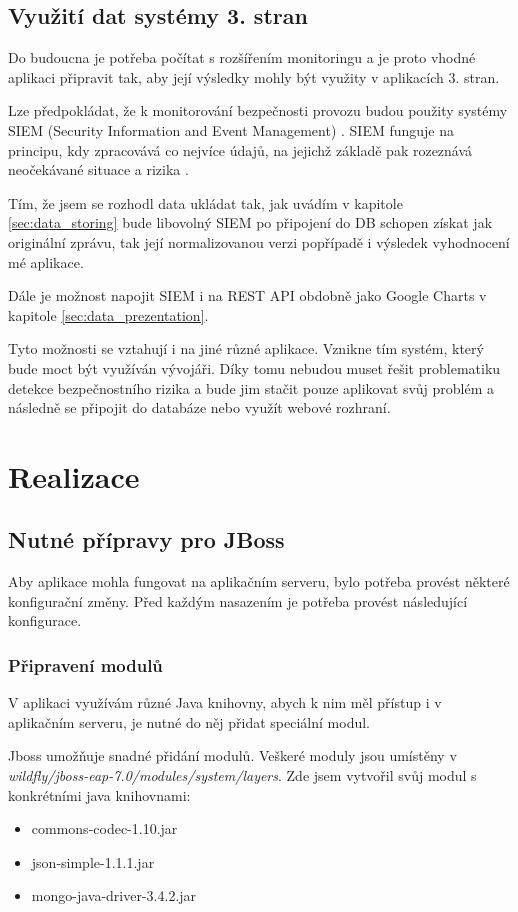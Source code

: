 \documentclass[thesis=M,czech]{FITthesis}[2012/10/20]
\begin{document}
	\section{Využití dat systémy 3. stran}
		Do budoucna je potřeba počítat s rozšířením monitoringu a je proto vhodné aplikaci připravit tak, aby její výsledky mohly být využity v aplikacích 3. stran.
		
		Lze předpokládat, že k monitorování bezpečnosti provozu budou použity systémy SIEM (Security Information and Event Management) \cite{siem}.
		SIEM funguje na principu, kdy zpracovává co nejvíce údajů, na jejichž základě pak rozeznává neočekávané situace a rizika \cite{howDesSiemWork}.
		
		Tím, že jsem se rozhodl data ukládat tak, jak uvádím v kapitole \ref{sec:data_storing} bude libovolný SIEM po připojení do DB schopen získat jak originální zprávu, tak její normalizovanou verzi popřípadě i výsledek vyhodnocení mé aplikace.
		
		Dále je možnost napojit SIEM i na REST API obdobně jako Google Charts v kapitole \ref{sec:data_prezentation}.
		
		Tyto možnosti se vztahují i na jiné různé aplikace. Vznikne tím systém, který bude moct být využíván vývojáři. Díky tomu nebudou muset řešit problematiku detekce bezpečnostního rizika a bude jim stačit pouze aplikovat svůj problém a následně se připojit do databáze nebo využít webové rozhraní. 
		
\chapter{Realizace}
	
	\section{Nutné přípravy pro JBoss}
		Aby aplikace mohla fungovat na aplikačním serveru, bylo potřeba provést některé konfigurační změny. Před každým nasazením je potřeba provést následující konfigurace.
		
		\subsection{Připravení modulů}
		V aplikaci využívám různé Java knihovny, abych k nim měl přístup i v aplikačním serveru, je nutné do něj přidat speciální modul.
		
		Jboss umožňuje snadné přidání modulů. Veškeré moduly jsou umístěny v \textit{wildfly/jboss-eap-7.0/modules/system/layers}. Zde jsem vytvořil svůj modul s konkrétními java knihovnami:
		\begin{itemize} 
			\item commons-codec-1.10.jar
			\item json-simple-1.1.1.jar
			\item mongo-java-driver-3.4.2.jar		
		\end{itemize}
	
\end{document}
